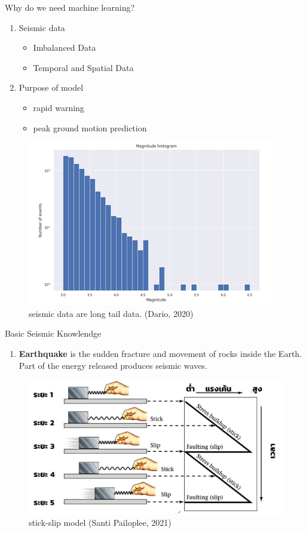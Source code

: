 \documentclass{beamer}
\newcounter{saveenumi}
\newcommand{\seti}{\setcounter{saveenumi}{\value{enumi}}}
\begin{document}
	\begin{frame}[t]{Why do we need machine learning?}
		\begin{enumerate}
			\item Seismic data
			\begin{itemize}
				\item Imbalanced Data
				\item Temporal and Spatial Data
			\end{itemize}
			\item Purpose of model
			\begin{itemize}
				\item rapid warning
				\item peak ground motion prediction
			\end{itemize}
		\end{enumerate}
		
		\begin{figure}
			\includegraphics[scale=0.5]{imb.png}
			\caption{seismic data are long tail data. (Dario, 2020)}
		\end{figure}
	\end{frame}
	\begin{frame}[t]{Basic Seismic Knowlendge}
		
		\begin{enumerate}
			\item \textbf{Earthquake} is the sudden fracture and movement of rocks inside the Earth.  Part of the energy released produces seismic waves.
			\seti
		\end{enumerate}
		\begin{figure}
			\centering
			\includegraphics[scale=0.5]{stick.jpg}
			\caption{stick-slip model (Santi Pailoplee, 2021)}
		\end{figure}
	\end{frame}
\end{document}
